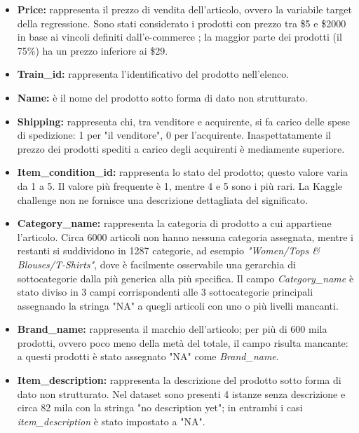 \begin{itemize}


\item \textbf{Price:} rappresenta il prezzo di vendita dell'articolo, ovvero la
variabile target della regressione. Sono stati considerato i prodotti con prezzo tra \$5 e
\$2000 in base ai vincoli definiti dall'e-commerce
\cite{mercari-how-to-set-a-price}; la maggior parte dei prodotti (il 75\%) ha un
prezzo inferiore ai \$29.

\item \textbf{Train\_id:} rappresenta l'identificativo del prodotto nell'elenco.

\item \textbf{Name:} è il nome del prodotto sotto forma di dato non strutturato.

\item \textbf{Shipping:} rappresenta chi, tra venditore e acquirente, si fa
carico delle spese di spedizione: 1 per "il venditore", 0 per l'acquirente.
Inaspettatamente il prezzo dei prodotti spediti a carico degli
acquirenti è mediamente superiore.

\item \textbf{Item\_condition\_id:} rappresenta lo stato del prodotto; questo valore
varia da 1 a 5. Il valore più frequente è 1, mentre 4 e 5 sono i più rari. La
Kaggle challenge non ne fornisce una descrizione dettagliata del significato.

\item \textbf{Category\_name:} rappresenta la categoria di prodotto a cui appartiene
l'articolo.
Circa 6000 articoli non hanno nessuna categoria assegnata, mentre i restanti
si suddividono in 1287 categorie, ad esempio \textit{"Women/Tops \&
Blouses/T-Shirts"}, dove è facilmente osservabile una gerarchia di
sottocategorie dalla più generica alla più specifica. Il campo
\textit{Category\_name} è stato diviso in 3 campi corrispondenti alle 3
sottocategorie principali assegnando la stringa "NA" a quegli articoli con uno o
più livelli mancanti.

\item \textbf{Brand\_name:} rappresenta il marchio dell'articolo; per più di 600
mila prodotti, ovvero poco meno della metà del totale, il campo risulta
mancante: a questi prodotti è stato assegnato "NA" come \textit{Brand\_name}.

\item \textbf{Item\_description:} rappresenta la descrizione del prodotto sotto forma
di dato non strutturato.
Nel dataset sono presenti 4 istanze senza descrizione e
circa 82 mila con la stringa "no description yet"; in entrambi i casi
\textit{item\_description} è stato impostato a "NA".


\end{itemize}
